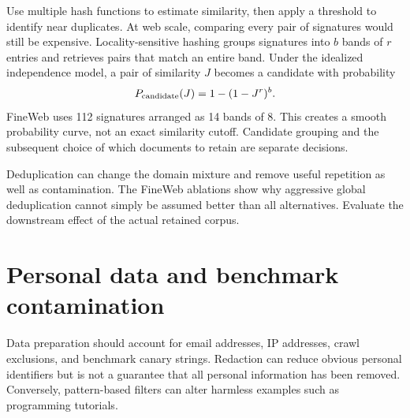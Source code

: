 

Use multiple hash functions to estimate similarity, then apply a threshold to identify near duplicates. At web scale, comparing every pair of signatures would still be expensive. Locality-sensitive hashing groups signatures into $b$ bands of $r$ entries and retrieves pairs that match an entire band. Under the idealized independence model, a pair of similarity $J$ becomes a candidate with probability
\begin{equation}
P_{\rm candidate}(J)=1-(1-J^r)^b.
\end{equation}
FineWeb uses 112 signatures arranged as 14 bands of 8. This creates a smooth probability curve, not an exact similarity cutoff. Candidate grouping and the subsequent choice of which documents to retain are separate decisions.

Deduplication can change the domain mixture and remove useful repetition as well as contamination. The FineWeb ablations show why aggressive global deduplication cannot simply be assumed better than all alternatives. Evaluate the downstream effect of the actual retained corpus.

\section{Personal data and benchmark contamination}
Data preparation should account for email addresses, IP addresses, crawl exclusions, and benchmark canary strings. Redaction can reduce obvious personal identifiers but is not a guarantee that all personal information has been removed. Conversely, pattern-based filters can alter harmless examples such as programming tutorials.

